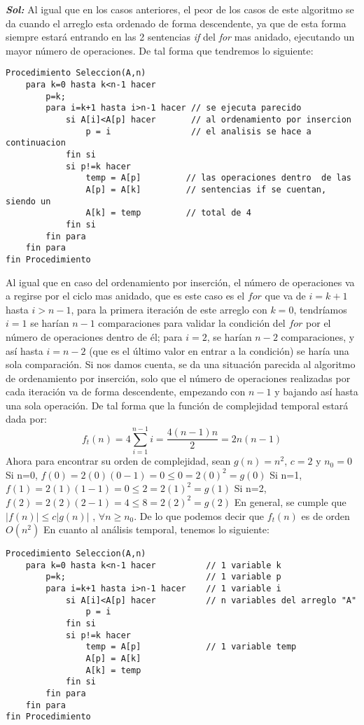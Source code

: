 \documentclass[12pt, letterpaper, twoside]{article}
\begin{document}
\justify
\textbf{\textit{Sol:}}
Al igual que en los casos anteriores, el peor de los casos de este algoritmo se da cuando el arreglo esta ordenado de forma descendente, ya que de esta forma siempre estará entrando en las 2 sentencias \textit{if} del \textit{for} mas anidado, ejecutando un mayor número de operaciones. De tal forma que tendremos lo siguiente:
\begin{lstlisting}
Procedimiento Seleccion(A,n)
	para k=0 hasta k<n-1 hacer
		p=k;
		para i=k+1 hasta i>n-1 hacer // se ejecuta parecido  
			si A[i]<A[p] hacer		 // al ordenamiento por insercion
				p = i				 // el analisis se hace a continuacion
			fin si
			si p!=k hacer      
				temp = A[p]			// las operaciones dentro  de las 
				A[p] = A[k]			// sentencias if se cuentan, siendo un 
				A[k] = temp			// total de 4
			fin si
		fin para
	fin para
fin Procedimiento
\end{lstlisting}
Al igual que en caso del ordenamiento por inserción, el número de operaciones va a regirse por el ciclo mas anidado, que es este caso es el $for$ que va de $i=k+1$ hasta $i>n-1$, para la primera iteración de este arreglo con $k=0$, tendríamos $i=1$ se harían $n-1$ comparaciones para validar la condición del $for$ por el número de operaciones dentro de él; para $i=2$, se harían $n-2$ comparaciones, y así hasta $i=n-2$ (que es el último valor en entrar a la condición) se haría una sola comparación.\newline
Si nos damos cuenta, se da una situación parecida al algoritmo de ordenamiento por inserción, solo que el número de operaciones realizadas por cada iteración va de forma descendente, empezando con $n-1$ y bajando así hasta una sola operación. De tal forma que la función de complejidad temporal estará dada por:
\[f_{t}(n)=4\sum_{i=1}^{n-1}i=\frac{4(n-1)n}{2}=2n(n-1)\]
Ahora para encontrar su orden de complejidad, sean $g(n)=n^{2}$, $c=2$ y $n_{0}=0$\newline
Si n=0,
\center$f(0)=2(0)(0-1)=0\leq 0 = 2(0)^{2}=g(0)$
\justify
Si n=1,
\center$f(1)=2(1)(1-1)=0\leq 2 = 2(1)^{2}=g(1)$
\justify
Si n=2,
\center$f(2)=2(2)(2-1)=4\leq 8 = 2(2)^{2}=g(2)$
\justify
En general, se cumple que
\center$|f(n)|\leq c|g(n)|$ , $\forall n\geq n_{0}$.
\justify
De lo que podemos decir que $f_{t}(n)$ es de orden $O(n^{2})$\newline
En cuanto al análisis temporal, tenemos lo siguiente:
\begin{lstlisting}
Procedimiento Seleccion(A,n)
	para k=0 hasta k<n-1 hacer			// 1 variable k
		p=k;							// 1 variable p
		para i=k+1 hasta i>n-1 hacer 	// 1 variable i 
			si A[i]<A[p] hacer		 	// n variables del arreglo "A" 
				p = i				 
			fin si
			si p!=k hacer      
				temp = A[p]				// 1 variable temp 
				A[p] = A[k]			 
				A[k] = temp			
			fin si
		fin para
	fin para
fin Procedimiento
\end{lstlisting}
\end{document}
